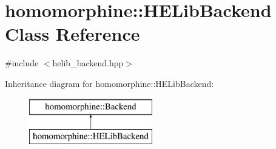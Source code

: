 \hypertarget{classhomomorphine_1_1_h_e_lib_backend}{}\section{homomorphine\+::H\+E\+Lib\+Backend Class Reference}
\label{classhomomorphine_1_1_h_e_lib_backend}


{\ttfamily \#include $<$helib\+\_\+backend.\+hpp$>$}

Inheritance diagram for homomorphine\+::H\+E\+Lib\+Backend\+:\begin{figure}[H]
\begin{center}
\leavevmode
\includegraphics[height=2.000000cm]{classhomomorphine_1_1_h_e_lib_backend}
\end{center}
\end{figure}
